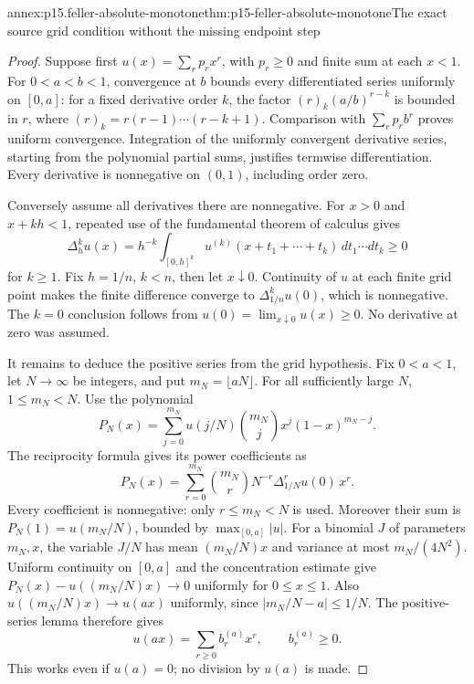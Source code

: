 \begin{annexitem}{annex:p15.feller-absolute-monotone}{thm:p15-feller-absolute-monotone}{The exact source grid condition without the missing endpoint step}
\begin{proof}
Suppose first \(u(x)=\sum_r p_rx^r\), with \(p_r\geq0\) and
finite sum at each \(x<1\). For \(0<a<b<1\), convergence at \(b\)
bounds every differentiated series uniformly on \([0,a]\):
for a fixed derivative order \(k\), the factor
\((r)_k(a/b)^{r-k}\) is bounded in \(r\), where
\((r)_k=r(r-1)\cdots(r-k+1)\).
Comparison with \(\sum_rp_rb^r\) proves uniform convergence.
Integration of the uniformly convergent derivative series, starting
from the polynomial partial sums, justifies termwise differentiation.
Every derivative is nonnegative on \((0,1)\), including order zero.

Conversely assume all derivatives there are nonnegative.
For \(x>0\) and \(x+kh<1\), repeated use of the fundamental theorem
of calculus gives
\[
 \Delta_h^ku(x)
  =h^{-k}\int_{[0,h]^k}u^{(k)}(x+t_1+\cdots+t_k)\,
                                  dt_1\cdots dt_k\geq0
\]
for \(k\geq1\). Fix \(h=1/n\), \(k<n\), then let \(x\downarrow0\).
Continuity of \(u\) at each finite grid point makes the finite
difference converge to \(\Delta_{1/n}^ku(0)\), which is nonnegative.
The \(k=0\) conclusion follows from \(u(0)=\lim_{x\downarrow0}u(x)\geq0\).
No derivative at zero was assumed.

It remains to deduce the positive series from the grid hypothesis.
Fix \(0<a<1\), let \(N\to\infty\) be integers, and put
\(m_N=\lfloor aN\rfloor\).
For all sufficiently large \(N\), \(1\leq m_N<N\).
Use the polynomial
\[
 P_N(x)=\sum_{j=0}^{m_N}u(j/N)\binom{m_N}j x^j(1-x)^{m_N-j}.
\]
The reciprocity formula gives its power coefficients as
\[
 P_N(x)=\sum_{r=0}^{m_N}\binom{m_N}r N^{-r}
                                      \Delta_{1/N}^ru(0)\,x^r.
\]
Every coefficient is nonnegative: only \(r\leq m_N<N\) is used.
Moreover their sum is \(P_N(1)=u(m_N/N)\), bounded by
\(\max_{[0,a]}|u|\).
For a binomial \(J\) of parameters \(m_N,x\), the variable \(J/N\)
has mean \((m_N/N)x\) and variance at most \(m_N/(4N^2)\).
Uniform continuity on \([0,a]\) and the concentration estimate give
\(P_N(x)-u((m_N/N)x)\to0\) uniformly for \(0\leq x\leq1\).
Also \(u((m_N/N)x)\to u(ax)\) uniformly, since
\(|m_N/N-a|\leq1/N\).
The positive-series lemma therefore gives
\[
                         u(ax)=\sum_{r\geq0}b_r^{(a)}x^r,
                         \qquad b_r^{(a)}\geq0.
\]
This works even if \(u(a)=0\); no division by \(u(a)\) is made.


\end{proof}
\end{annexitem}
